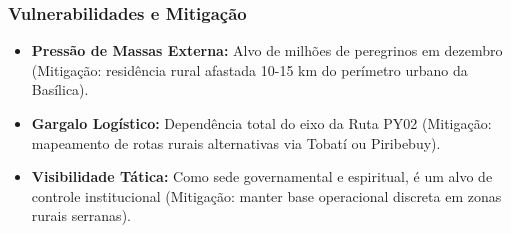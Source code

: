 \subsubsection{Vulnerabilidades e
Mitigação}

\begin{itemize}
\tightlist
\item
  \textbf{Pressão de Massas Externa:} Alvo de milhões de peregrinos em
  dezembro (Mitigação: residência rural afastada 10-15 km do perímetro
  urbano da Basílica).
\item
  \textbf{Gargalo Logístico:} Dependência total do eixo da Ruta PY02
  (Mitigação: mapeamento de rotas rurais alternativas via Tobatí ou
  Piribebuy).
\item
  \textbf{Visibilidade Tática:} Como sede governamental e espiritual, é
  um alvo de controle institucional (Mitigação: manter base operacional
  discreta em zonas rurais serranas).
\end{itemize}

